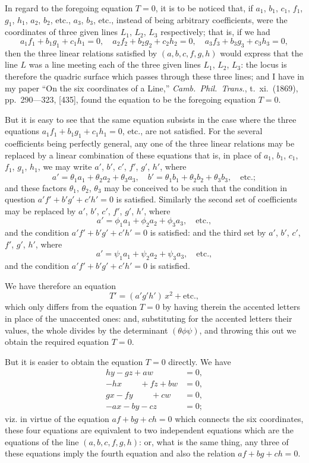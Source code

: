 \documentclass[12pt,a4paper]{article}
\theoremstyle{cayley}
\theoremstyle{definition}
\numberwithin{equation}{section}
\begin{document}
In regard to the foregoing equation $T = 0$, it is to be noticed that, if $a_1$, $b_1$, $c_1$, $f_1$, $g_1$, $h_1$, $a_2$, $b_2$, etc., $a_3$, $b_3$, etc., instead of being arbitrary coefficients, were the coordinates of three given lines $L_1$, $L_2$, $L_3$ respectively; that is, if we had
\[
a_1 f_1 + b_1 g_1 + c_1 h_1 = 0, \quad a_2 f_2 + b_2 g_2 + c_2 h_2 = 0, \quad a_3 f_3 + b_3 g_3 + c_3 h_3 = 0,
\]
then the three linear relations satisfied by $(a, b, c, f, g, h)$ would express that the line $L$ was a line meeting each of the three given lines $L_1$, $L_2$, $L_3$: the locus is therefore the quadric surface which passes through these three lines; and I have in my paper ``On the six coordinates of a Line,'' \textit{Camb.\ Phil.\ Trans.}, t.\ xi.\ (1869), pp.\ 290---323, [435], found the equation to be the foregoing equation $T=0$.

But it is easy to see that the same equation subsists in the case where the three equations $a_1 f_1 + b_1 g_1 + c_1 h_1 = 0$, etc., are not satisfied. For the several coefficients being perfectly general, any one of the three linear relations may be replaced by a linear combination of these equations that is, in place of $a_1$, $b_1$, $c_1$, $f_1$, $g_1$, $h_1$, we may write $a'$, $b'$, $c'$, $f'$, $g'$, $h'$, where
\[
a' = \theta_1 a_1 + \theta_2 a_2 + \theta_3 a_3, \quad b' = \theta_1 b_1 + \theta_2 b_2 + \theta_3 b_3, \quad \text{etc.};
\]
and these factors $\theta_1$, $\theta_2$, $\theta_3$ may be conceived to be such that the condition in question $a' f' + b' g' + c' h' = 0$ is satisfied. Similarly the second set of coefficients may be replaced by $a'$, $b'$, $c'$, $f'$, $g'$, $h'$, where
\[
a' = \phi_1 a_1 + \phi_2 a_2 + \phi_3 a_3, \quad \text{etc.},
\]
and the condition $a' f' + b' g' + c' h' = 0$ is satisfied: and the third set by $a'$, $b'$, $c'$, $f'$, $g'$, $h'$, where
\[
a' = \psi_1 a_1 + \psi_2 a_2 + \psi_3 a_3, \quad \text{etc.},
\]
and the condition $a' f' + b' g' + c' h' = 0$ is satisfied.

We have therefore an equation
\[
T' = (a'g'h')\, x^2 + \text{etc.},
\]
which only differs from the equation $T=0$ by having therein the accented letters in place of the unaccented ones: and, substituting for the accented letters their values, the whole divides by the determinant $(\theta\phi\psi)$, and throwing this out we obtain the required equation $T = 0$.

But it is easier to obtain the equation $T=0$ directly. We have
\begin{align*}
hy - gz + aw &= 0, \\
-hx \phantom{{}-gz} + fz + bw &= 0, \\
gx - fy \phantom{{}+fz} + cw &= 0, \\
-ax - by - cz \phantom{{}+cw} &= 0;
\end{align*}
viz. in virtue of the equation $af + bg + ch = 0$ which connects the six coordinates, these four equations are equivalent to two independent equations which are the equations of the line $(a, b, c, f, g, h)$: or, what is the same thing, any three of these equations imply the fourth equation and also the relation $af + bg + ch = 0$.
\end{document}
